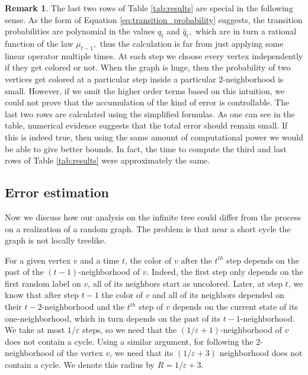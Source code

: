 \documentclass{article}
\theoremstyle{definition}
\newtheorem{remark}[definition]{Remark}
\newcommand{\eps}{\varepsilon}
\begin{document}
\begin{remark}\label{simplified}
    The last two rows of Table \ref{tab:results} are special in the following sense. As the form of Equation \eqref{eq:transition_probability} suggests, the transition probabilities are polynomial in the values $q_t$ and $\hat q_t,$ which are in turn a rational function of the law $\mu_{t-1},$ thus the calculation is far from just applying some linear operator multiple times. At each step we choose every vertex independently if they get colored or not. When the graph is huge, then the probability of two vertices get colored at a particular step inside a particular $2$-neighborhood is small. However, if we omit the higher order terms based on this intuition, we could not prove that the accumulation of the kind of error is controllable. The last two rows are calculated using the simplified formulas. As one can see in the table, numerical evidence suggests that the total error should remain small. If this is indeed true, then using the same amount of computational power we would be able to give better bounds. In fact, the time to compute the third and last rows of Table \ref{tab:results} were approximately the same.
\end{remark}

\subsection{Error estimation}
Now we discuss how our analysis on the infinite tree could differ from the process on a realization of a random graph. The problem is that near a short cycle the graph is not locally treelike.


For a given vertex $v$ and a time $t$, the color of $v$ after the $t^{th}$ step depends on the past of the $(t-1)$-neighborhood of  $v$. Indeed, the first step only depends on the first random label on $v$, all of its neighbors start as uncolored. Later, at step $t$, we know that after step $t-1$ the color of $v$ and all of its neighbors depended on their $t-2$-neighborhood and the $t^{th}$ step of $v$ depends on the current state of its one-neighborhood, which in turn depends on the past of its $t-1$-neighborhood. We take at most $1/\eps$ steps, so we need that the $(1/\eps+1)$-neighborhood of $v$ does not contain a cycle. Using a similar argument, for following the $2$-neighborhood of the vertex $v$, we need that its $(1/\eps+3)$ neighborhood does not contain a cycle. We denote this radius by $R=1/\eps+3.$
\end{document}
